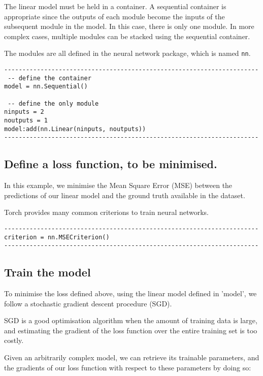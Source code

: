 The linear model must be held in a container. A sequential container
is appropriate since the outputs of each module become the inputs of 
the subsequent module in the model. In this case, there is only one
module. In more complex cases, multiple modules can be stacked using
the sequential container.

The modules are all defined in the neural network package, which is
named {\tt nn}.

\begin{verbatim}
----------------------------------------------------------------------
 -- define the container
model = nn.Sequential()         

 -- define the only module       
ninputs = 2
noutputs = 1
model:add(nn.Linear(ninputs, noutputs))
----------------------------------------------------------------------
\end{verbatim}

\subsection{Define a loss function, to be minimised.}

In this example, we minimise the Mean Square Error (MSE) between
the predictions of our linear model and the ground truth available
in the dataset.

Torch provides many common criterions to train neural networks.

\begin{verbatim}
----------------------------------------------------------------------
criterion = nn.MSECriterion()
----------------------------------------------------------------------
\end{verbatim}

\subsection{Train the model}

To minimise the loss defined above, using the linear model defined
in 'model', we follow a stochastic gradient descent procedure (SGD).

SGD is a good optimisation algorithm when the amount of training data
is large, and estimating the gradient of the loss function over the 
entire training set is too costly.

Given an arbitrarily complex model, we can retrieve its trainable
parameters, and the gradients of our loss function with respect to these 
parameters by doing so:

